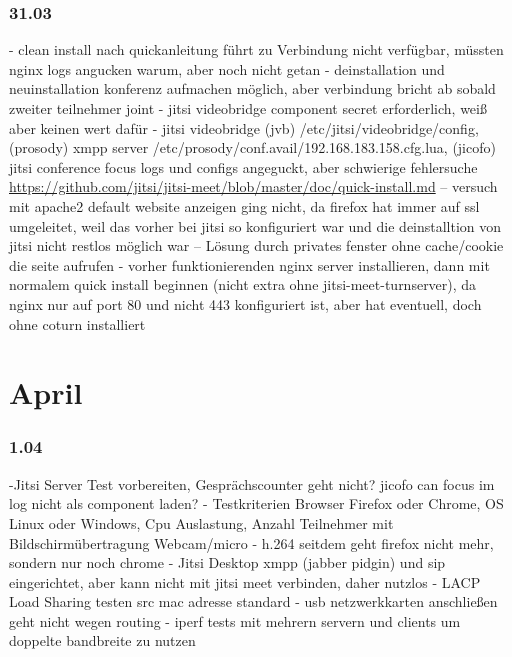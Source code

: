 \documentclass[english,runningheads,a4paper]{llncs}[2018/03/10]
\begin{document}
\subsubsection{31.03}
- clean install nach quickanleitung führt zu Verbindung nicht verfügbar, müssten nginx logs angucken warum, aber noch nicht getan
- deinstallation und neuinstallation konferenz aufmachen möglich, aber verbindung bricht ab sobald zweiter teilnehmer joint
- jitsi videobridge component secret erforderlich, weiß aber keinen wert dafür
- jitsi videobridge (jvb) /etc/jitsi/videobridge/config, (prosody) xmpp server /etc/prosody/conf.avail/192.168.183.158.cfg.lua, (jicofo) jitsi conference focus logs und configs angeguckt, aber schwierige fehlersuche
\url{https://github.com/jitsi/jitsi-meet/blob/master/doc/quick-install.md}
-- versuch mit apache2 default website anzeigen ging nicht, da  firefox hat immer auf ssl umgeleitet, weil das vorher bei jitsi so konfiguriert war und die deinstalltion von jitsi nicht restlos möglich war
-- Lösung durch privates fenster ohne cache/cookie die seite aufrufen
- vorher funktionierenden nginx server installieren, dann mit normalem quick install beginnen (nicht extra ohne jitsi-meet-turnserver), da nginx nur auf port 80 und nicht 443 konfiguriert ist, aber hat eventuell, doch ohne coturn installiert
\section{April}
\subsubsection{1.04}
-Jitsi Server Test vorbereiten, Gesprächscounter geht nicht? jicofo can focus im log nicht als component laden?
- Testkriterien Browser Firefox oder Chrome, OS Linux oder Windows, Cpu Auslastung, Anzahl Teilnehmer mit Bildschirmübertragung Webcam/micro
- h.264 seitdem geht firefox nicht mehr, sondern nur noch chrome
- Jitsi Desktop xmpp (jabber pidgin) und sip eingerichtet, aber kann nicht mit jitsi meet verbinden, daher nutzlos
- LACP Load Sharing testen src mac adresse standard
- usb netzwerkkarten anschließen geht nicht wegen routing
- iperf tests mit mehrern servern und clients um doppelte bandbreite zu nutzen
\end{document}
